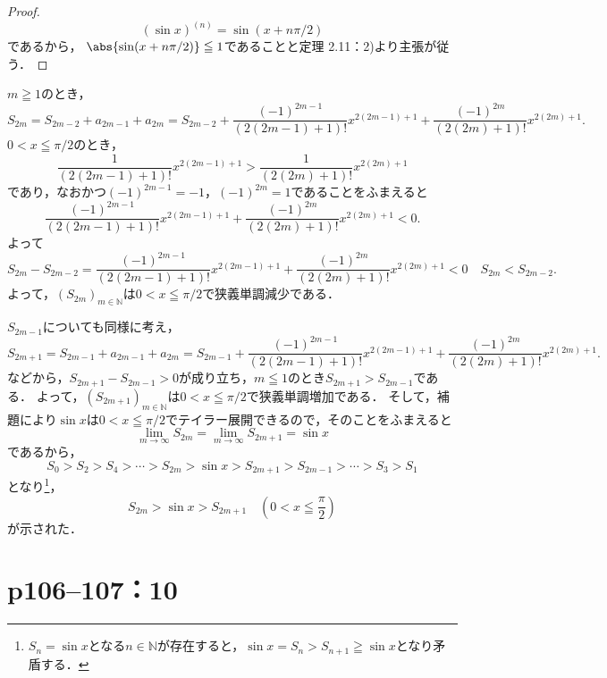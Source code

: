 \begin{proof}
  \[
    (\sin x)^{(n)} =\sin(x + n\pi/2)
  \]
  であるから， $ \abs{\sin (x+n\pi/2)}  \leqq 1$であることと定理 2.11：2)より主張が従う．
\end{proof}

\begin{tproof}
  $m \geqq 1$のとき，
  \[
    S_{2m} = S_{2m-2} +a_{2m-1} + a_{2m} = S_{2m-2} + \frac{(-1)^{2m-1}}{(2(2m-1)+1)!} x^{2(2m-1)+1} + \frac{(-1)^{2m}}{(2(2m)+1)!} x^{2(2m)+1}.
  \]
  $ 0< x \leqq \pi /2$のとき，
  \[
    \frac{1}{(2(2m-1)+1)!} x^{2(2m-1)+1} > \frac{1}{(2(2m)+1)!} x^{2(2m)+1}
  \]
  であり，なおかつ$(-1)^{2m-1} =-1$，$(-1)^{2m} =1$であることをふまえると
  \[
    \frac{(-1)^{2m-1}}{(2(2m-1)+1)!} x^{2(2m-1)+1} + \frac{(-1)^{2m}}{(2(2m)+1)!} x^{2(2m)+1} <0.
  \]
  よって
  \[
    S_{2m} -S_{2m-2}  = \frac{(-1)^{2m-1}}{(2(2m-1)+1)!} x^{2(2m-1)+1} + \frac{(-1)^{2m}}{(2(2m)+1)!} x^{2(2m)+1} <0 \quad S_{2m}<S_{2m-2}.
  \]
  よって，$(S_{2m})_{m \in \mathbb{N}}$は$0 < x \leqq \pi /2$で狭義単調減少である．

  $S_{2m-1}$についても同様に考え，
  \[
    S_{2m+1}=S_{2m-1} + a_{2m-1} +a_{2m}= S_{2m-1} + \frac{(-1)^{2m-1}}{(2(2m-1)+1)!} x^{2(2m-1)+1} + \frac{(-1)^{2m}}{(2(2m)+1)!} x^{2(2m)+1}.
  \]
  などから，$ S_{2m+1}-S_{2m-1} >0$が成り立ち，$m \leqq 1$のとき$S_{2m+1}>S_{2m-1}$である．
  よって，$(S_{2m+1})_{m \in \mathbb{N}}$は$0 < x \leqq \pi /2$で狭義単調増加である．
  そして，補題により$\sin x $は$0 < x \leqq \pi /2$でテイラー展開できるので，そのことをふまえると
  \[
    \lim_{m \to \infty} S_{2m} =\lim_{m \to \infty} S_{2m+1} =\sin x
  \]
  であるから，
  \[
    S_0 > S_2 > S_4 > \cdots > S_{2m} > \sin x > S_{2m+1} > S_{2m-1} > \cdots > S_3 > S_1
  \]
  となり\footnote{$S_n=\sin x$となる$n \in \mathbb{N}$が存在すると，$ \sin x=S_n  > S_{n+1}\geqq \sin x$となり矛盾する．}，
  \[
    S_{2m} > \sin x > S_{2m+1} \quad ( 0 < x \leqq \frac{\pi}{2} )
  \]
  が示された．
\end{tproof}


\section*{p106--107：10}



